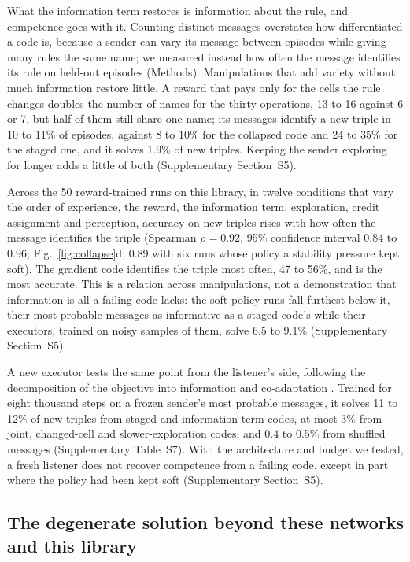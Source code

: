 \documentclass{nature}
\begin{document}
What the information term restores is information about the rule, and competence goes with it. Counting distinct messages
overstates how differentiated a code is, because a sender can vary its message between episodes while giving many
rules the same name; we measured instead how often the message identifies its rule on held-out episodes (Methods).
Manipulations that add variety without much information restore little. A reward that pays only for the cells the
rule changes doubles the number of names for the thirty operations, 13 to 16 against 6 or 7, but half of them still
share one name; its messages identify a new triple in 10 to 11\% of episodes, against 8 to 10\% for the collapsed
code and 24 to 35\% for the staged one, and it solves 1.9\% of new triples. Keeping the sender exploring for longer
adds a little of both (Supplementary Section~S5).

Across the 50 reward-trained runs on this library, in twelve conditions that vary the order of experience, the
reward, the information term, exploration, credit assignment and perception, accuracy on new triples rises with how
often the message identifies the triple (Spearman $\rho = 0.92$, 95\% confidence interval 0.84 to 0.96;
Fig.~\ref{fig:collapse}d; 0.89 with six runs whose policy a stability pressure kept soft). The gradient code
identifies the triple most often, 47 to 56\%, and is the most accurate. This is a relation across manipulations,
not a demonstration that information is all a failing code lacks: the soft-policy runs fall furthest below it,
their most probable messages as informative as a staged code's while their executors, trained on noisy samples of
them, solve 6.5 to 9.1\% (Supplementary Section~S5).

A new executor tests the same point from the listener's side, following the decomposition of the objective into
information and co-adaptation \cite{rita2022}. Trained for eight thousand steps on a frozen sender's most probable
messages, it solves 11 to 12\% of new triples from staged and information-term codes, at most 3\% from joint,
changed-cell and slower-exploration codes, and 0.4 to 0.5\% from shuffled messages (Supplementary Table~S7). With
the architecture and budget we tested, a fresh listener does not recover competence from a failing code, except in
part where the policy had been kept soft (Supplementary Section~S5).

\subsection*{The degenerate solution beyond these networks and this library}
\end{document}
